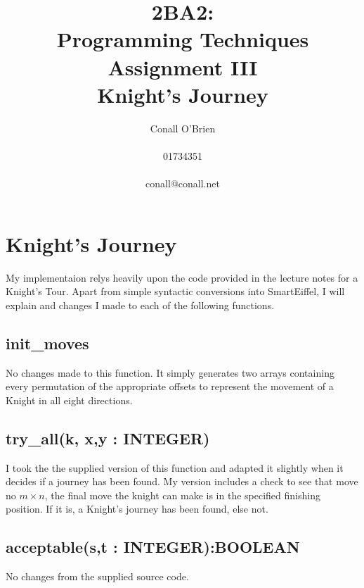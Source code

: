 \documentclass[a4paper,12pt]{article}
\begin{document}
\title{2BA2: \\ Programming Techniques \\ Assignment III \\ Knight's Journey}

\author{Conall O'Brien \\ \\ 01734351 \\ \\ conall@conall.net}

\maketitle

\pagebreak

\section{Knight's Journey}

My implementaion relys heavily upon the code provided in the lecture
notes for a Knight's Tour. Apart from simple syntactic conversions into
SmartEiffel, I will explain and changes I made to each of the following
functions.

\subsection{init\_moves}

No changes made to this function. It simply generates two arrays
containing every permutation of the appropriate offsets to represent 
the movement of a Knight in all eight directions.

\subsection{try\_all(k, x,y : INTEGER)}

I took the the supplied version of this function and adapted it slightly
when it decides if a journey has been found. My version includes a check
to see that move no $m \times n$, the final move the knight can make is
in the specified finishing position. If it is, a Knight's journey has
been found, else not.

\subsection{acceptable(s,t : INTEGER):BOOLEAN}

No changes from the supplied source code.
\end{document}
